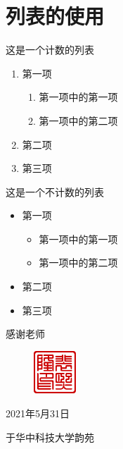 \documentclass[supercite]{HustGraduPaper}
\begin{document}
\section{列表的使用}
这是一个计数的列表
\begin{enumerate}
	\item 第一项
	      \begin{enumerate}
		      \item 第一项中的第一项
		      \item 第一项中的第二项
	      \end{enumerate}
	\item 第二项
	\item 第三项
\end{enumerate}

这是一个不计数的列表
\begin{itemize}
	\item 第一项
	      \begin{itemize}
		      \item 第一项中的第一项
		      \item 第一项中的第二项
	      \end{itemize}
	\item 第二项
	\item 第三项
\end{itemize}

\begin{thankpage}
	感谢老师
	\begin{figure}[htb]
		\flushright
		\includegraphics[width=16mm]{Figures/Seal-pxl.pdf}
	\end{figure}

	\begin{flushright}
		2021年5月31日

		于华中科技大学韵苑
	\end{flushright}
	
\end{thankpage}


\end{document}

